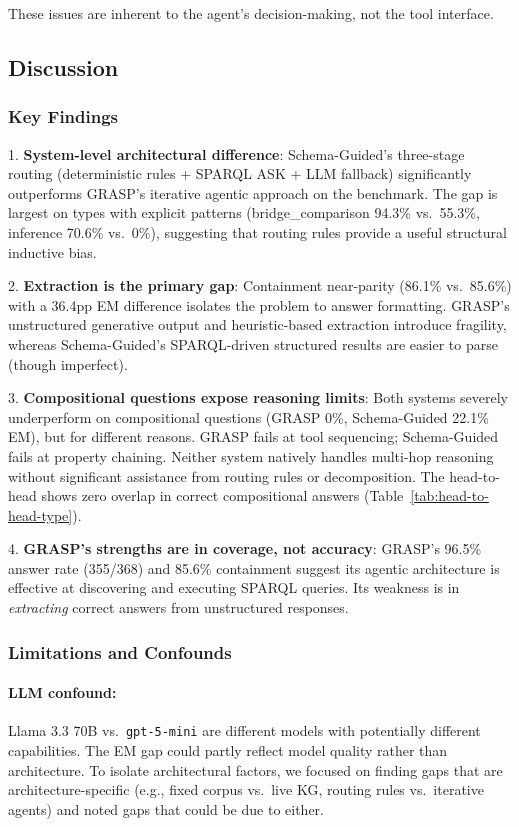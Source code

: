 These issues are inherent to the agent's decision-making, not the tool interface.

\subsection{Discussion}
\label{sec:baseline-discussion}

\subsubsection{Key Findings}

1. \textbf{System-level architectural difference}: Schema-Guided's three-stage routing (deterministic rules + SPARQL ASK + LLM fallback) significantly outperforms GRASP's iterative agentic approach on the benchmark. The gap is largest on types with explicit patterns (bridge\_comparison 94.3\% vs.\ 55.3\%, inference 70.6\% vs.\ 0\%), suggesting that routing rules provide a useful structural inductive bias.

2. \textbf{Extraction is the primary gap}: Containment near-parity (86.1\% vs.\ 85.6\%) with a 36.4pp EM difference isolates the problem to answer formatting. GRASP's unstructured generative output and heuristic-based extraction introduce fragility, whereas Schema-Guided's SPARQL-driven structured results are easier to parse (though imperfect).

3. \textbf{Compositional questions expose reasoning limits}: Both systems severely underperform on compositional questions (GRASP 0\%, Schema-Guided 22.1\% EM), but for different reasons. GRASP fails at tool sequencing; Schema-Guided fails at property chaining. Neither system natively handles multi-hop reasoning without significant assistance from routing rules or decomposition. The head-to-head shows zero overlap in correct compositional answers (Table~\ref{tab:head-to-head-type}).

4. \textbf{GRASP's strengths are in coverage, not accuracy}: GRASP's 96.5\% answer rate (355/368) and 85.6\% containment suggest its agentic architecture is effective at discovering and executing SPARQL queries. Its weakness is in \textit{extracting} correct answers from unstructured responses.

\subsubsection{Limitations and Confounds}

\paragraph{LLM confound:} Llama 3.3 70B vs.\ \texttt{gpt-5-mini} are different models with potentially different capabilities. The EM gap could partly reflect model quality rather than architecture. To isolate architectural factors, we focused on finding gaps that are architecture-specific (e.g., fixed corpus vs.\ live KG, routing rules vs.\ iterative agents) and noted gaps that could be due to either.

